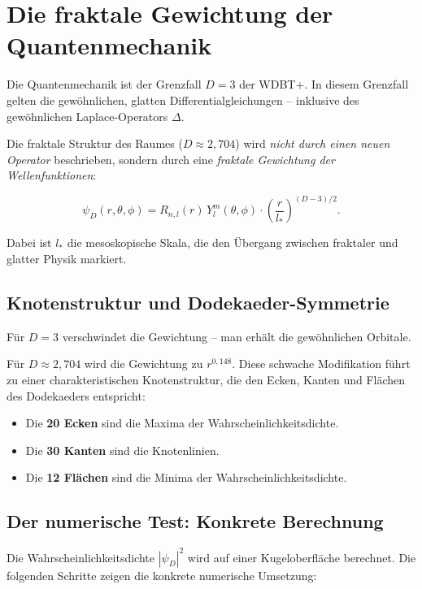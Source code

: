 \chapter{Die fraktale Gewichtung der Quantenmechanik}

Die Quantenmechanik ist der Grenzfall \( D = 3 \) der WDBT+. In diesem Grenzfall gelten die gewöhnlichen, glatten Differentialgleichungen – inklusive des
gewöhnlichen Laplace-Operators \( \Delta \).

Die fraktale Struktur des Raumes (\( D \approx 2,704 \)) wird \emph{nicht durch einen neuen Operator} beschrieben, sondern durch eine
\emph{fraktale Gewichtung der Wellenfunktionen}:

\begin{equation}
\psi_D(r, \theta, \phi) = R_{n,l}(r) \, Y_l^m(\theta, \phi) \cdot \left( \frac{r}{l_*} \right)^{(D-3)/2}. \tag{6.1}
\end{equation}

Dabei ist \( l_* \) die mesoskopische Skala, die den Übergang zwischen fraktaler und glatter Physik markiert.

\section{Knotenstruktur und Dodekaeder-Symmetrie}

Für \( D = 3 \) verschwindet die Gewichtung – man erhält die gewöhnlichen Orbitale.

Für \( D \approx 2,704 \) wird die Gewichtung zu \( r^{0,148} \). Diese schwache Modifikation führt zu einer charakteristischen Knotenstruktur, die den Ecken, Kanten
und Flächen des Dodekaeders entspricht:

\begin{itemize}
    \item Die \textbf{20 Ecken} sind die Maxima der Wahrscheinlichkeitsdichte.
    \item Die \textbf{30 Kanten} sind die Knotenlinien.
    \item Die \textbf{12 Flächen} sind die Minima der Wahrscheinlichkeitsdichte.
\end{itemize}

\section{Der numerische Test: Konkrete Berechnung}

Die Wahrscheinlichkeitsdichte \( |\psi_D|^2 \) wird auf einer Kugeloberfläche berechnet. Die folgenden Schritte zeigen die konkrete numerische Umsetzung:

